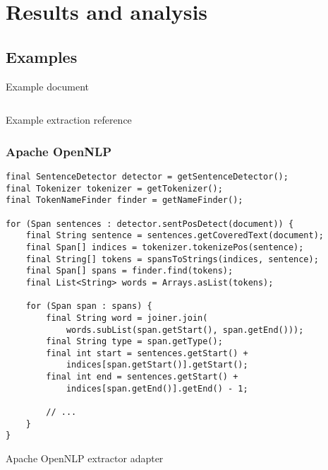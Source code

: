 \section{Results and analysis}
\label{sec:results}

\subsection{Examples}

\begin{listing}[H]
\texttt{}
\caption{Example document}
\label{lst:example-document}
\end{listing}

\begin{listing}[H]
\inputminted{xml}{reference.xml}
\caption{Example extraction reference}
\label{lst:example-reference}
\end{listing}


\newpage
\subsubsection{Apache OpenNLP}

\begin{listing}[H]
\begin{verbatim}
final SentenceDetector detector = getSentenceDetector();
final Tokenizer tokenizer = getTokenizer();
final TokenNameFinder finder = getNameFinder();

for (Span sentences : detector.sentPosDetect(document)) {
    final String sentence = sentences.getCoveredText(document);
    final Span[] indices = tokenizer.tokenizePos(sentence);
    final String[] tokens = spansToStrings(indices, sentence);
    final Span[] spans = finder.find(tokens);
    final List<String> words = Arrays.asList(tokens);

    for (Span span : spans) {
        final String word = joiner.join(
            words.subList(span.getStart(), span.getEnd()));
        final String type = span.getType();
        final int start = sentences.getStart() + 
            indices[span.getStart()].getStart();
        final int end = sentences.getStart() + 
            indices[span.getEnd()].getEnd() - 1;

        // ...
    }
}
\end{verbatim}
\caption{Apache OpenNLP extractor adapter}
\label{lst:opennlp-adapter}
\end{listing}

